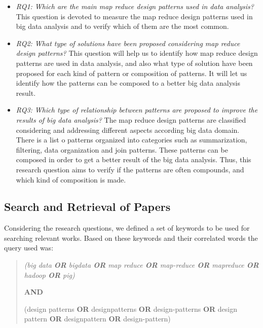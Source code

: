 \begin{itemize}
\item {\em RQ1: Which are the main map reduce design patterns used in data
analysis?} This question is devoted to measure the map reduce design patterns
used in big data analysis and to verify which of them are the most common.

\item {\em RQ2: What type of solutions have been proposed considering map
reduce design patterns?} This question will help us to identify how map reduce
design patterns are used in data analysis, and also
what type of solution have been proposed for each kind of pattern or
composition of patterns. It will let us identify how the patterns can be
composed to a better big data analysis result.
 
\item  {\em RQ3: Which type of relationship between patterns are proposed to
improve the results of big data analysis?} The map reduce design patterns are
classified considering and addressing different aspects
according big data domain. There is a list o patterns organized into categories
such as summarization, filtering, data organization and join patterns. These
patterns can be composed in order to get a better result of the big data
analysis. Thus, this research question aims to verify if the patterns are often
compounds, and which kind of composition is made.


\end{itemize}

\subsection{Search and Retrieval of Papers}

Considering the research questions, we defined a set of keywords to be used for
searching relevant works. Based on these keywords and their
correlated words the query used was:        
 
\begin{quote} \sl
\qquad  (big data \textbf{OR} bigdata \textbf{OR} map reduce \textbf{OR}
map-reduce \textbf{OR} mapreduce \textbf{OR} hadoop \textbf{OR} pig)

\textbf{AND}

\qquad (design patterns \textbf{OR} designpatterns \textbf{OR}
design-patterns \textbf{OR} design pattern
\textbf{OR} designpattern \textbf{OR} design-pattern)
\end{quote}


